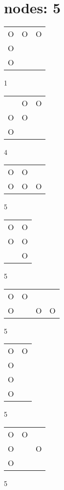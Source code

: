 \section{nodes: 5}
\begin{tabular}{|m{0.2cm}m{0.2cm}m{0.2cm}|}\hline
O&O&O\\
O& & \\
O& & \\
\hline\end{tabular}1
\begin{tabular}{|m{0.2cm}m{0.2cm}m{0.2cm}|}\hline
 &O&O\\
O&O& \\
O& & \\
\hline\end{tabular}4
\begin{tabular}{|m{0.2cm}m{0.2cm}m{0.2cm}|}\hline
O&O& \\
O&O&O\\
\hline\end{tabular}5
\begin{tabular}{|m{0.2cm}m{0.2cm}|}\hline
O&O\\
O&O\\
 &O\\
\hline\end{tabular}5
\begin{tabular}{|m{0.2cm}m{0.2cm}m{0.2cm}m{0.2cm}|}\hline
O&O& & \\
O& &O&O\\
\hline\end{tabular}5
\begin{tabular}{|m{0.2cm}m{0.2cm}|}\hline
O&O\\
O& \\
O& \\
O& \\
\hline\end{tabular}5
\begin{tabular}{|m{0.2cm}m{0.2cm}m{0.2cm}|}\hline
O&O& \\
O& &O\\
O& & \\
\hline\end{tabular}5
